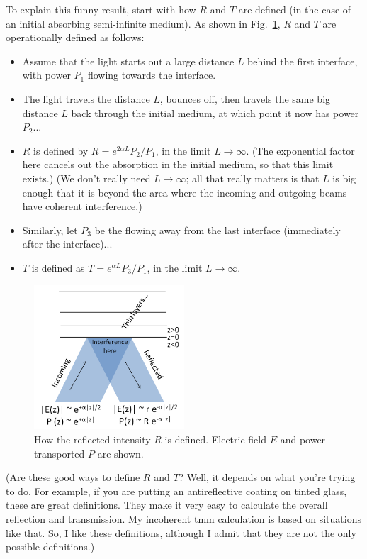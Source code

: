 \documentclass[12pt]{article}
\renewcommand{\(}{\left(}
\renewcommand{\)}{\right)}
\begin{document}
To explain this funny result, start with how $R$ and $T$ are defined (in the case of an initial absorbing semi-infinite medium). As shown in Fig.~\ref{Rfig}, $R$ and $T$ are operationally defined as follows:
\begin{itemize}
\item Assume that the light starts out a large distance $L$ behind the first interface, with power $P_1$ flowing towards the interface.
\item The light travels the distance $L$, bounces off, then travels the same big distance $L$ back through the initial medium, at which point it now has power $P_2$...
\item $R$ is defined by $R=e^{2\alpha L} P_2 / P_1$, in the limit $L\rightarrow \infty$. (The exponential factor here cancels out the absorption in the initial medium, so that this limit exists.) (We don't really need $L \rightarrow \infty$; all that really matters is that $L$ is big enough that it is beyond the area where the incoming and outgoing beams have coherent interference.)
\item Similarly, let $P_3$ be the flowing away from the last interface (immediately after the interface)...
\item $T$ is defined as $T =e^{\alpha L} P_3 / P_1$, in the limit $L \rightarrow \infty$.
\end{itemize}

\begin{figure}[htb]
\centering
\includegraphics[width=0.5\textwidth]{Rfig.png}
\caption{How the reflected intensity $R$ is defined. Electric field $E$ and power transported $P$ are shown.\label{Rfig}}
\end{figure}

(Are these good ways to define $R$ and $T$? Well, it depends on what you're trying to do. For example, if you are putting an antireflective coating on tinted glass, these are great definitions. They make it very easy to calculate the overall reflection and transmission. My incoherent tmm calculation is based on situations like that. So, I like these definitions, although I admit that they are not the only possible definitions.)
\end{document}
